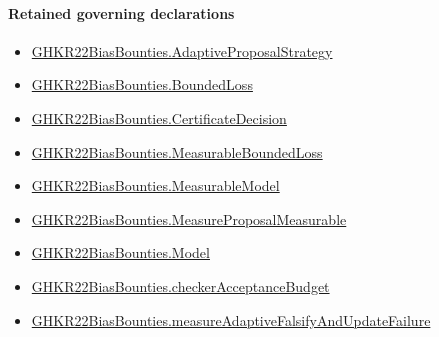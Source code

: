 \documentclass[10pt]{article}
\begin{document}
\paragraph{Retained governing declarations}
\begin{itemize}\raggedright
\item \hyperlink{governing-declaration-40e727eb3f6ea003}{GHKR22\allowbreak{}Bias\allowbreak{}Bounties.\allowbreak{}Adaptive\allowbreak{}Proposal\allowbreak{}Strategy}
\item \hyperlink{paper-prerequisite-ef6c319b0770dad4}{GHKR22\allowbreak{}Bias\allowbreak{}Bounties.\allowbreak{}Bounded\allowbreak{}Loss}
\item \hyperlink{governing-declaration-7881732e3fc3c15e}{GHKR22\allowbreak{}Bias\allowbreak{}Bounties.\allowbreak{}Certificate\allowbreak{}Decision}
\item \hyperlink{governing-declaration-56b96e1cde76e3f7}{GHKR22\allowbreak{}Bias\allowbreak{}Bounties.\allowbreak{}Measurable\allowbreak{}Bounded\allowbreak{}Loss}
\item \hyperlink{governing-declaration-8b721c00962c326a}{GHKR22\allowbreak{}Bias\allowbreak{}Bounties.\allowbreak{}Measurable\allowbreak{}Model}
\item \hyperlink{governing-declaration-034d3030fa5618e0}{GHKR22\allowbreak{}Bias\allowbreak{}Bounties.\allowbreak{}Measure\allowbreak{}Proposal\allowbreak{}Measurable}
\item \hyperlink{paper-prerequisite-333127605c12eba8}{GHKR22\allowbreak{}Bias\allowbreak{}Bounties.\allowbreak{}Model}
\item \hyperlink{paper-prerequisite-3296eacfe5745d61}{GHKR22\allowbreak{}Bias\allowbreak{}Bounties.\allowbreak{}checker\allowbreak{}Acceptance\allowbreak{}Budget}
\item \hyperlink{governing-declaration-cdb53288034d39d8}{GHKR22\allowbreak{}Bias\allowbreak{}Bounties.\allowbreak{}measure\allowbreak{}Adaptive\allowbreak{}Falsify\allowbreak{}And\allowbreak{}Update\allowbreak{}Failure}
\end{itemize}
\end{document}
